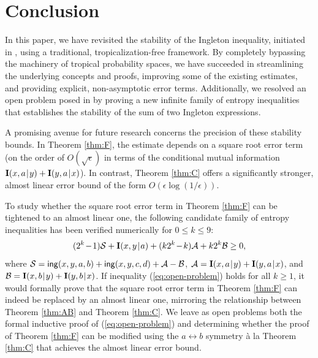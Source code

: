 \documentclass[a4paper]{IEEEtran}
\def\|{\mskip1.5mu{|}\mskip1.5mu}
\def\I{\mathbf I}
\def\m#1{\mskip 1.5mu{#1}\mskip 1.5mu}
\def\ing[#1,#2,#3,#4]{\mathsf{ing}(#1,#2,#3,#4\mkern 0mu)}
\theoremstyle{definition}
\begin{document}

\section{Conclusion}\label{sec:conc}

In this paper, we have revisited the stability of the Ingleton inequality,
initiated in \cite{rom3}, using a traditional, tropicalization-free
framework. By completely bypassing the machinery of tropical probability
spaces, we have succeeded in streamlining the underlying concepts and
proofs, improving some of the existing estimates, and providing explicit,
non-asymptotic error terms. Additionally, we resolved an open problem posed
in \cite{rom3} by proving a new infinite family of entropy inequalities that
establishes the stability of the sum of two Ingleton expressions.

A promising avenue for future research concerns the precision of these
stability bounds. In Theorem \ref{thm:F}, the estimate depends on a square
root error term (on the order of $O(\sqrt{\epsilon})$ in terms of the
conditional mutual information $\I(x,a\|y) + \I(y,a\|x)$). In contrast,
Theorem \ref{thm:C} offers a significantly stronger, almost linear error
bound of the form $O(\epsilon \log(1/\epsilon))$.

To study whether the square root error term in Theorem \ref{thm:F} can be
tightened to an almost linear one, the following candidate family of entropy
inequalities has been verified numerically for $0\le k \le 9$:
\begin{equation}\label{eq:open-problem}
  (2^k\m-1)\mathcal S + \I(x,y\|a) +
      (k2^k\m-k)\mathcal A + k2^k\mathcal B \ge 0,
\end{equation}
where $\mathcal S = \ing[x,y,a,b] + \ing[x,y,c,d] + \mathcal A- \mathcal B$,
$\mathcal A = \I(x,a\|y) + \I(y,a\|x)$, and $\mathcal B =
\I(x,b\|y) + \I(y,b\|x)$. If inequality (\ref{eq:open-problem}) holds for
all $k \ge 1$, it would formally prove that the square root error term in
Theorem \ref{thm:F} can indeed be replaced by an almost linear one,
mirroring the relationship between Theorem \ref{thm:AB} and Theorem
\ref{thm:C}. We leave as open problems both the formal inductive proof of
(\ref{eq:open-problem}) and determining whether the proof of Theorem
\ref{thm:F} can be modified using the $a\leftrightarrow b$ symmetry \`a la
Theorem \ref{thm:C} that achieves the almost linear error bound.

\end{document}
